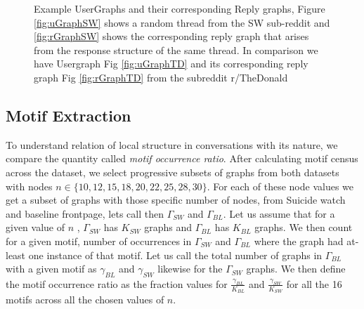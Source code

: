 \begin{figure}[!ht]
	\caption{ Example UserGraphs and their corresponding Reply graphs, Figure \ref{fig:uGraphSW} shows a random thread from the SW sub-reddit and \ref{fig:rGraphSW} shows the corresponding reply graph that arises from the response structure of the same thread. In comparison we have Usergraph Fig \ref{fig:uGraphTD} and its corresponding reply graph Fig \ref{fig:rGraphTD} from the subreddit r/TheDonald }
	\label{Fig:GraphExamples}
\end{figure}

\subsection{Motif Extraction}
To understand relation of local structure in conversations with its nature, we compare the quantity called \textsl{motif occurrence ratio}. After calculating motif census across the dataset\cite{Batagelj2001}, we select progressive subsets of graphs from both datasets with nodes $n \in \{10 , 12 , 15 , 18 , 20 , 22 , 25 , 28 , 30\}$. For each of these node values we get a subset of graphs with those specific number of nodes, from Suicide watch and baseline frontpage, lets call then $\Gamma_{SW}$ and $\Gamma_{BL}$. Let us assume that for a given value of $n$ , $\Gamma_{SW}$ has $K_{SW}$ graphs and $\Gamma_{BL}$ has $K_{BL}$ graphs. We then count for a given motif, number of occurrences in $\Gamma_{SW}$ and $\Gamma_{BL}$ where the graph had at-least one instance of that motif. Let us call the total number of graphs in $\Gamma_{BL}$ with a given motif as $\gamma_{BL}$ and $\gamma_{SW}$ likewise for the $\Gamma_{SW}$ graphs. 
We then define the motif occurrence ratio as the fraction values for $\frac{\gamma_{BL}}{K_{BL}}$ and $\frac{\gamma_{SW}}{K_{SW}}$ for all the 16 motifs across all the chosen values of $n$. 
